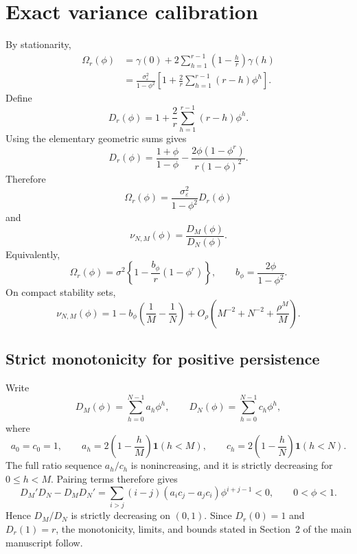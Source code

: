 \documentclass[12pt]{article}
\theoremstyle{remark}
\begin{document}
\section{Exact variance calibration}
\label{supp:variance}
By stationarity,
\begin{align*}
\Omega_r(\phi)
&=\gamma(0)+2\sum_{h=1}^{r-1}\left(1-\frac hr\right)\gamma(h)\\
&=\frac{\sigma_\varepsilon^2}{1-\phi^2}
\left[1+\frac2r\sum_{h=1}^{r-1}(r-h)\phi^h\right].
\end{align*}
Define
\[
D_r(\phi)=1+\frac2r\sum_{h=1}^{r-1}(r-h)\phi^h.
\]
Using the elementary geometric sums gives
\begin{equation}
D_r(\phi)
=\frac{1+\phi}{1-\phi}
-\frac{2\phi(1-\phi^r)}{r(1-\phi)^2}.
\label{eq:supp-Dr-closed}
\end{equation}
Therefore
\[
\Omega_r(\phi)
=\frac{\sigma_\varepsilon^2}{1-\phi^2}D_r(\phi)
\]
and
\begin{equation*}
\nu_{N,M}(\phi)=\frac{D_M(\phi)}{D_N(\phi)}.
\end{equation*}
Equivalently,
\begin{equation}
\Omega_r(\phi)
=\sigma^2\left\{1-\frac{b_\phi}{r}(1-\phi^r)\right\},
\qquad
b_\phi=\frac{2\phi}{1-\phi^2}.
\label{eq:supp-Omega-longrun}
\end{equation}
On compact stability sets,
\begin{equation}
\nu_{N,M}(\phi)
=1-b_\phi\left(\frac1M-\frac1N\right)
+O_\rho\left(M^{-2}+N^{-2}+\frac{\rho^M}{M}\right).
\label{eq:supp-nu-expansion}
\end{equation}

\subsection{Strict monotonicity for positive persistence}
Write
\[
D_M(\phi)=\sum_{h=0}^{N-1}a_h\phi^h,
\qquad
D_N(\phi)=\sum_{h=0}^{N-1}c_h\phi^h,
\]
where
\[
a_0=c_0=1,
\qquad
a_h=2\left(1-\frac hM\right)\mathbf 1(h<M),
\qquad
c_h=2\left(1-\frac hN\right)\mathbf 1(h<N).
\]
The full ratio sequence $a_h/c_h$ is nonincreasing, and it is strictly decreasing for $0\le h<M$. Pairing terms therefore gives
\begin{equation*}
D_M'D_N-D_MD_N'
=\sum_{i>j}(i-j)(a_ic_j-a_jc_i)\phi^{i+j-1}<0,
\qquad 0<\phi<1.
\end{equation*}
Hence $D_M/D_N$ is strictly decreasing on $(0,1)$. Since $D_r(0)=1$ and $D_r(1)=r$, the monotonicity, limits, and bounds stated in Section~2 of the main manuscript follow.
\end{document}
